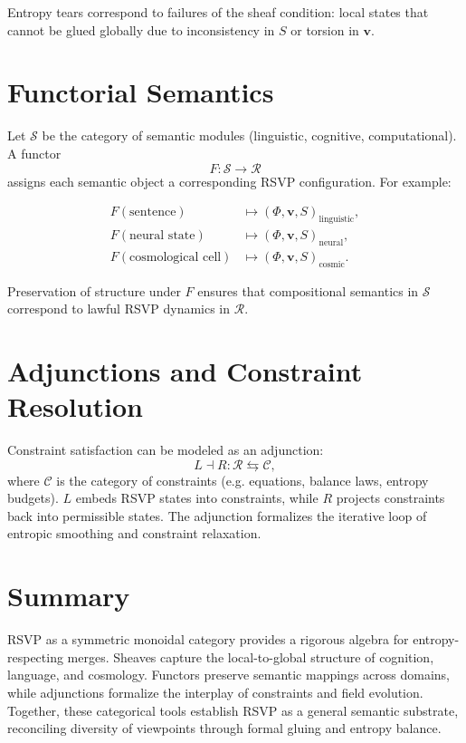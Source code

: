 \documentclass[a4paper,11pt,openany]{book}
\begin{document}
Entropy tears correspond to failures of the sheaf condition: local states that cannot 
be glued globally due to inconsistency in $S$ or torsion in $\mathbf{v}$.

\section{Functorial Semantics}

Let $\mathcal{S}$ be the category of semantic modules (linguistic, cognitive, 
computational). A functor
\[
F: \mathcal{S} \to \mathcal{R}
\]
assigns each semantic object a corresponding RSVP configuration. For example:

\begin{align*}
F(\text{sentence}) &\mapsto (\Phi, \mathbf{v}, S)_{\text{linguistic}}, \\
F(\text{neural state}) &\mapsto (\Phi, \mathbf{v}, S)_{\text{neural}}, \\
F(\text{cosmological cell}) &\mapsto (\Phi, \mathbf{v}, S)_{\text{cosmic}}.
\end{align*}

Preservation of structure under $F$ ensures that compositional semantics 
in $\mathcal{S}$ correspond to lawful RSVP dynamics in $\mathcal{R}$.

\section{Adjunctions and Constraint Resolution}

Constraint satisfaction can be modeled as an adjunction:
\[
L \dashv R : \mathcal{R} \leftrightarrows \mathcal{C},
\]
where $\mathcal{C}$ is the category of constraints (e.g. equations, 
balance laws, entropy budgets). $L$ embeds RSVP states into constraints, 
while $R$ projects constraints back into permissible states. The adjunction 
formalizes the iterative loop of entropic smoothing and constraint relaxation.

\section{Summary}

RSVP as a symmetric monoidal category provides a rigorous algebra for 
entropy-respecting merges. Sheaves capture the local-to-global structure 
of cognition, language, and cosmology. Functors preserve semantic mappings 
across domains, while adjunctions formalize the interplay of constraints and 
field evolution. Together, these categorical tools establish RSVP as a 
general semantic substrate, reconciling diversity of viewpoints through 
formal gluing and entropy balance.
\end{document}
